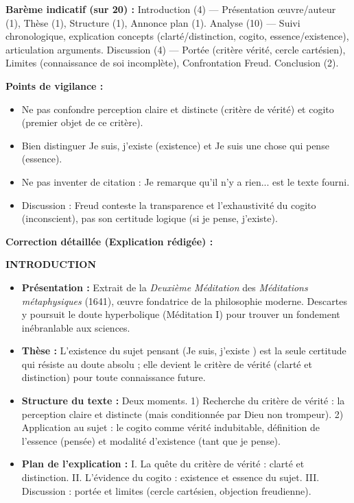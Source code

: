 \documentclass[11pt]{article}
\newcommand{\cle}[1]{{\popxbold\color{popdark}#1}}
\begin{document}
\begin{corrige}
\textbf{Barème indicatif (sur 20) :} Introduction (4) — Présentation œuvre/auteur (1), Thèse (1), Structure (1), Annonce plan (1). Analyse (10) — Suivi chronologique, explication concepts (clarté/distinction, cogito, essence/existence), articulation arguments. Discussion (4) — Portée (critère vérité, cercle cartésien), Limites (connaissance de soi incomplète), Confrontation Freud. Conclusion (2).

\textbf{Points de vigilance :}
\begin{itemize}
\item Ne pas confondre \guillemotleft perception claire et distincte \guillemotright (critère de vérité) et \guillemotleft cogito \guillemotright (premier objet de ce critère).
\item Bien distinguer \guillemotleft Je suis, j'existe \guillemotright (existence) et \guillemotleft Je suis une chose qui pense \guillemotright (essence).
\item Ne pas inventer de citation : \guillemotleft Je remarque qu'il n'y a rien... \guillemotright est le texte fourni.
\item Discussion : Freud conteste la \cle{transparence} et l'\cle{exhaustivité} du cogito (inconscient), pas son \cle{certitude logique} (si je pense, j'existe).
\end{itemize}

\textbf{Correction détaillée (Explication rédigée) :}

\textbf{INTRODUCTION}
\begin{itemize}
\item \textbf{Présentation :} Extrait de la \emph{Deuxième Méditation} des \emph{Méditations métaphysiques} (1641), œuvre fondatrice de la philosophie moderne. Descartes y poursuit le doute hyperbolique (Méditation I) pour trouver un fondement inébranlable aux sciences.
\item \textbf{Thèse :} L'existence du sujet pensant (\guillemotleft Je suis, j'existe \guillemotright) est la \cle{seule certitude} qui résiste au doute absolu ; elle devient le \cle{critère de vérité} (clarté et distinction) pour toute connaissance future.
\item \textbf{Structure du texte :} Deux moments. 1) Recherche du critère de vérité : la \cle{perception claire et distincte} (mais conditionnée par Dieu non trompeur). 2) Application au sujet : le \cle{cogito} comme vérité indubitable, définition de l'essence (pensée) et modalité d'existence (tant que je pense).
\item \textbf{Plan de l'explication :} I. La quête du critère de vérité : clarté et distinction. II. L'évidence du cogito : existence et essence du sujet. III. Discussion : portée et limites (cercle cartésien, objection freudienne).
\end{itemize}


\end{corrige}
\end{document}
